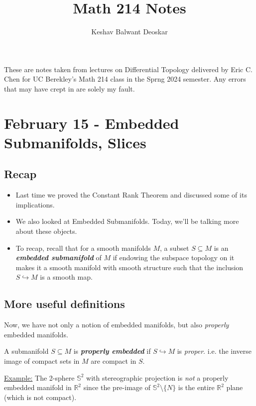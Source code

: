 \documentclass{article}
\title{Math 214 Notes}
\author{Keshav Balwant Deoskar}
\newcommand{\R}{\mathbb{R}}
\begin{document}
\maketitle

These are notes taken from lectures on Differential Topology delivered by Eric C. Chen for UC Berekley's Math 214 class in the Sprng 2024 semester. Any errors that may have crept in are solely my fault.

\tableofcontents

\pagebreak

\section{February 15 - Embedded Submanifolds, Slices}

\vskip 1cm
\subsection*{Recap}
\begin{itemize}
  \item Last time we proved the Constant Rank Theorem and discussed some of its implications.
  \item We also looked at Embedded Submanifolds. Today, we'll be talking more about these objects.
  \item To recap, recall that for a smooth manifolds $M$, a subset $S \subseteq M$ is an \emph{\textbf{embedded submanifold}} of $M$ if endowing the subspace topology on it makes it a smooth manifold with smooth structure such that the inclusion $S \hookrightarrow M$ is a smooth map.
\end{itemize}

\vskip 1cm
\subsection{More useful definitions}

Now, we have not only a notion of embedded manifolds, but also \emph{properly} embedded manifolds.

\begin{mathdefinitionbox}{}
  A submanifold $S \subseteq M$ is \emph{\textbf{properly embedded}} if $S \hookrightarrow M$ is \emph{proper}. i.e. the inverse image of compact sets in $M$ are compact in $S$.
\end{mathdefinitionbox}

\vskip 0.5cm
\underline{Example:} The 2-sphere $\mathbb{S}^2$ with stereographic projection is \emph{not} a properly embedded manifold in $\R^2$ since the pre-image of $\mathbb{S}^2 \setminus \{N\}$ is the entire $\R^2$ plane (which is not compact).
\end{document}
